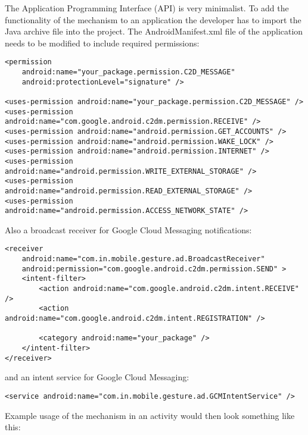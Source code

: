 The Application Programming Interface (API) is very minimalist. To add the functionality of the mechanism to an application the developer has to import the Java archive file into the project. The AndroidManifest.xml file of the application needs to be modified to include required permissions:

\lstset{language=XML}
\begin{lstlisting}
<permission
    android:name="your_package.permission.C2D_MESSAGE"
    android:protectionLevel="signature" />

<uses-permission android:name="your_package.permission.C2D_MESSAGE" />
<uses-permission android:name="com.google.android.c2dm.permission.RECEIVE" />
<uses-permission android:name="android.permission.GET_ACCOUNTS" />
<uses-permission android:name="android.permission.WAKE_LOCK" />
<uses-permission android:name="android.permission.INTERNET" />
<uses-permission android:name="android.permission.WRITE_EXTERNAL_STORAGE" />
<uses-permission android:name="android.permission.READ_EXTERNAL_STORAGE" />
<uses-permission android:name="android.permission.ACCESS_NETWORK_STATE" />
\end{lstlisting}

Also a broadcast receiver for Google Cloud Messaging notifications:

\begin{lstlisting}
<receiver
    android:name="com.in.mobile.gesture.ad.BroadcastReceiver"
    android:permission="com.google.android.c2dm.permission.SEND" >
    <intent-filter>
        <action android:name="com.google.android.c2dm.intent.RECEIVE" />
        <action android:name="com.google.android.c2dm.intent.REGISTRATION" />

        <category android:name="your_package" />
    </intent-filter>
</receiver>
\end{lstlisting}

and an intent service for Google Cloud Messaging:

\begin{lstlisting}
<service android:name="com.in.mobile.gesture.ad.GCMIntentService" />
\end{lstlisting}

Example usage of the mechanism in an activity would then look something like this:

\lstset{language=Java}

